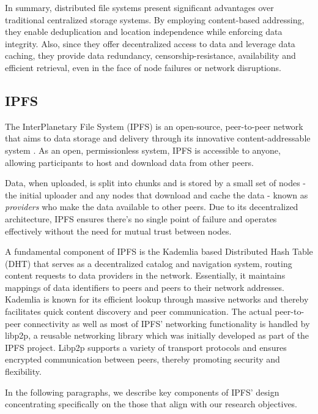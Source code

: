 In summary, distributed file systems present significant advantages over traditional centralized storage systems. By employing content-based addressing, they enable deduplication and location independence while enforcing data integrity. Also, since they offer decentralized access to data and leverage data caching, they provide data redundancy, censorship-resistance, availability and efficient retrieval, even in the face of node failures or network disruptions.

\subsection{IPFS}\label{sec:ipfs}
The InterPlanetary File System (IPFS) is an open-source, peer-to-peer network that aims to  data storage and delivery through its innovative content-addressable system \citep{benet_2014}. As an open, permissionless system, IPFS is accessible to anyone, allowing participants to host and download data from other peers. 

Data, when uploaded, is split into chunks and is stored by a small set of nodes - the initial uploader and any nodes that download and cache the data - known as \textit{providers} who make the data available to other peers. Due to its decentralized architecture, IPFS ensures there's no single point of failure and operates effectively without the need for mutual trust between nodes.

A fundamental component of IPFS is the Kademlia based Distributed Hash Table (DHT) \citep{maymounkov_2002} that serves as a decentralized catalog and navigation system, routing content requests to data providers in the network. Essentially, it maintains mappings of data identifiers to peers and peers to their network addresses. Kademlia is known \citep{benet_2014} for its efficient lookup  through massive networks and thereby facilitates quick content discovery and peer communication. The actual peer-to-peer connectivity as well as most of IPFS' networking functionality is handled by libp2p, a reusable networking library which was initially developed as part of the IPFS project. Libp2p \citep{libp2p_2023} supports a variety of transport protocols and ensures encrypted communication between peers, thereby promoting security and flexibility.

In the following paragraphs, we describe key components of IPFS’ design concentrating specifically on the those that align with our research objectives. 

